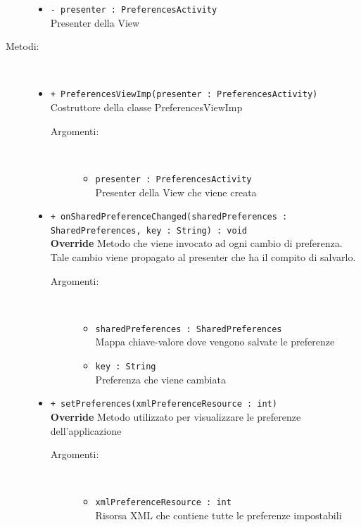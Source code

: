 \documentclass[../DefinizioneDiProdotto.tex]{subfiles}
\begin{document}
\begin{description}
\begin{itemize}
		\item \texttt{- presenter : PreferencesActivity}\\
		Presenter della View
		
	\end{itemize}
	\item[Metodi:] \
	\begin{itemize}
		\item \texttt{+ PreferencesViewImp(presenter : PreferencesActivity)}\\
		Costruttore della classe PreferencesViewImp
		\begin{description}
			\item[Argomenti:] \
			\begin{itemize}
				\item \texttt{presenter : PreferencesActivity}\\
				Presenter della View che viene creata\end{itemize}
		\end{description}
		\item \texttt{+ onSharedPreferenceChanged(sharedPreferences : SharedPreferences, key : String) : void}\\
		\textbf{Override} Metodo che viene invocato ad ogni cambio di preferenza. Tale cambio viene propagato al presenter che ha il compito di salvarlo.
		\begin{description}
			\item[Argomenti:] \
			\begin{itemize}
				\item \texttt{sharedPreferences : SharedPreferences}\\
				Mappa chiave-valore dove vengono salvate le preferenze\item \texttt{key : String}\\
				Preferenza che viene cambiata\end{itemize}
		\end{description}
		\item \texttt{+ setPreferences(xmlPreferenceResource : int)}\\
		\textbf{Override} Metodo utilizzato per visualizzare le preferenze dell'applicazione
		\begin{description}
			\item[Argomenti:] \
			\begin{itemize}
				\item \texttt{xmlPreferenceResource : int}\\
				Risorsa XML che contiene tutte le preferenze impostabili\end{itemize}
		\end{description}
	\end{itemize}
\end{description}
\end{document}
